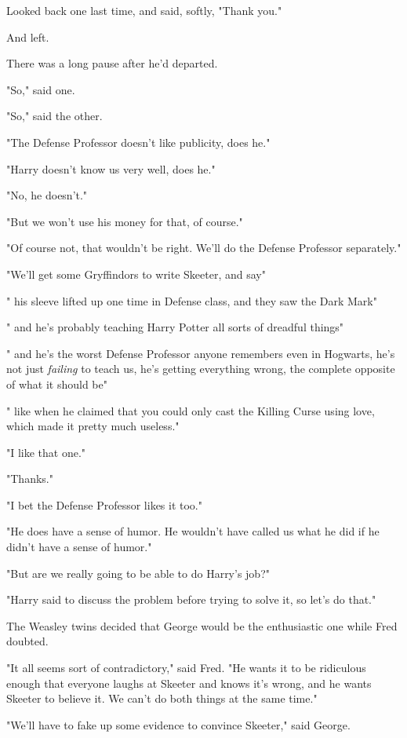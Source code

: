 Looked back one last time, and said, softly, "Thank you."

And left.

There was a long pause after he'd departed.

"So," said one.

"So," said the other.

"The Defense Professor doesn't like publicity, does he."

"Harry doesn't know us very well, does he."

"No, he doesn't."

"But we won't use his money for that, of course."

"Of course not, that wouldn't be right. We'll do the Defense Professor
separately."

"We'll get some Gryffindors to write Skeeter, and say{\el}"

"{\el} his sleeve lifted up one time in Defense class, and they saw the Dark
Mark{\el}"

"{\el} and he's probably teaching Harry Potter all sorts of dreadful
things{\el}"

"{\el} and he's the worst Defense Professor anyone remembers even in
Hogwarts, he's not just \emph{failing} to teach us, he's getting everything
wrong, the complete opposite of what it should be{\el}"

"{\el} like when he claimed that you could only cast the Killing Curse using
love, which made it pretty much useless."

"I like that one."

"Thanks."

"I bet the Defense Professor likes it too."

"He does have a sense of humor. He wouldn't have called us what he did if he
didn't have a sense of humor."

"But are we really going to be able to do Harry's job?"

"Harry said to discuss the problem before trying to solve it, so let's do that."

The Weasley twins decided that George would be the enthusiastic one while Fred
doubted.

"It all seems sort of contradictory," said Fred. "He wants it to be ridiculous
enough that everyone laughs at Skeeter and knows it's wrong, and he wants
Skeeter to believe it. We can't do both things at the same time."

"We'll have to fake up some evidence to convince Skeeter," said George.

